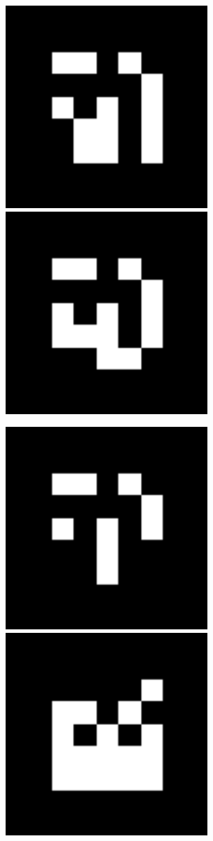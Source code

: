 \documentclass[10pt,letterpaper]{article}
\begin{document}
\includegraphics[width=3in]{MarkerData_125.png}
\includegraphics[width=3in]{MarkerData_126.png}


\includegraphics[width=3in]{MarkerData_127.png}
\includegraphics[width=3in]{MarkerData_128.png}
\end{document}
